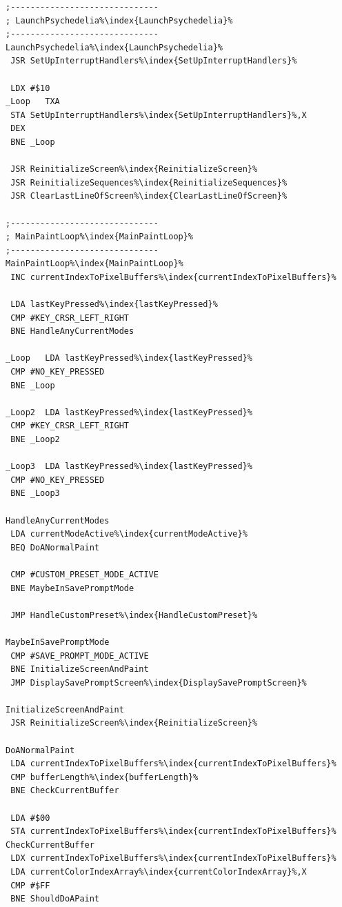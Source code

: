 \begin{minipage}[b]{0.33\linewidth}
\begin{lrbox}{\mybox}%
\begin{lstlisting}[basicstyle=\ttfamily\tiny,escapechar=\%]
;------------------------------
; LaunchPsychedelia%\index{LaunchPsychedelia}%
;------------------------------
LaunchPsychedelia%\index{LaunchPsychedelia}%
 JSR SetUpInterruptHandlers%\index{SetUpInterruptHandlers}%

 LDX #$10
_Loop   TXA
 STA SetUpInterruptHandlers%\index{SetUpInterruptHandlers}%,X
 DEX
 BNE _Loop

 JSR ReinitializeScreen%\index{ReinitializeScreen}%
 JSR ReinitializeSequences%\index{ReinitializeSequences}%
 JSR ClearLastLineOfScreen%\index{ClearLastLineOfScreen}%

;------------------------------
; MainPaintLoop%\index{MainPaintLoop}%
;------------------------------
MainPaintLoop%\index{MainPaintLoop}%
 INC currentIndexToPixelBuffers%\index{currentIndexToPixelBuffers}%

 LDA lastKeyPressed%\index{lastKeyPressed}%
 CMP #KEY_CRSR_LEFT_RIGHT
 BNE HandleAnyCurrentModes

_Loop   LDA lastKeyPressed%\index{lastKeyPressed}%
 CMP #NO_KEY_PRESSED
 BNE _Loop

_Loop2  LDA lastKeyPressed%\index{lastKeyPressed}%
 CMP #KEY_CRSR_LEFT_RIGHT
 BNE _Loop2

_Loop3  LDA lastKeyPressed%\index{lastKeyPressed}%
 CMP #NO_KEY_PRESSED
 BNE _Loop3

HandleAnyCurrentModes
 LDA currentModeActive%\index{currentModeActive}%
 BEQ DoANormalPaint

 CMP #CUSTOM_PRESET_MODE_ACTIVE
 BNE MaybeInSavePromptMode

 JMP HandleCustomPreset%\index{HandleCustomPreset}%

MaybeInSavePromptMode
 CMP #SAVE_PROMPT_MODE_ACTIVE
 BNE InitializeScreenAndPaint
 JMP DisplaySavePromptScreen%\index{DisplaySavePromptScreen}%

InitializeScreenAndPaint
 JSR ReinitializeScreen%\index{ReinitializeScreen}%

DoANormalPaint
 LDA currentIndexToPixelBuffers%\index{currentIndexToPixelBuffers}%
 CMP bufferLength%\index{bufferLength}%
 BNE CheckCurrentBuffer

 LDA #$00
 STA currentIndexToPixelBuffers%\index{currentIndexToPixelBuffers}%
CheckCurrentBuffer
 LDX currentIndexToPixelBuffers%\index{currentIndexToPixelBuffers}%
 LDA currentColorIndexArray%\index{currentColorIndexArray}%,X
 CMP #$FF
 BNE ShouldDoAPaint


\end{lstlisting}
\end{lrbox}
\end{minipage}

